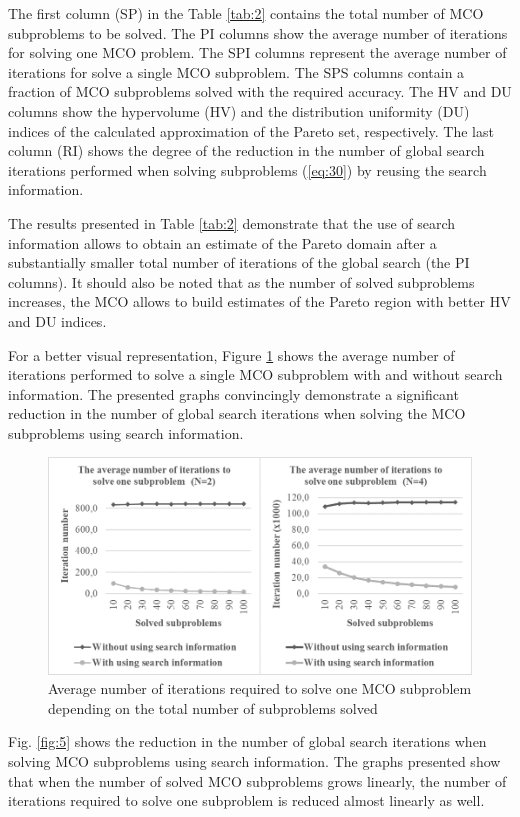 \documentclass[smallextended]{svjour3}       %
\begin{document}
The first column (SP) in the Table \ref{tab:2} contains the total number of MCO subproblems to be solved. The PI columns show the average number of iterations for solving one MCO problem. The SPI columns represent the average number of iterations for solve a single MCO subproblem. The SPS columns contain a fraction of MCO subproblems solved with the required accuracy. The HV and DU columns show the hypervolume (HV) and the distribution uniformity (DU) indices of the calculated approximation of the Pareto set, respectively. The last column (RI) shows the degree of the reduction in the number of global search iterations performed when solving subproblems (\ref{eq:30}) by reusing the search information.

The results presented in Table \ref{tab:2} demonstrate that the use of search information allows to obtain an estimate of the Pareto domain after a substantially smaller total number of iterations of the global search (the PI columns). It should also be noted that as the number of solved subproblems increases, the MCO allows to build estimates of the Pareto region with better HV and DU indices.

For a better visual representation, Figure \ref{fig:4} shows the average number of iterations performed to solve a single MCO subproblem with and without search information. The presented graphs convincingly demonstrate a significant reduction in the number of global search iterations when solving the MCO subproblems using search information.

\begin{figure}
  \centering
  \includegraphics[width=1\linewidth]{fig4}
  \caption{Average number of iterations required to solve one MCO subproblem depending on the total number of subproblems solved}
  \label{fig:4}
\end{figure}

Fig. \ref{fig:5} shows the reduction in the number of global search iterations when solving MCO subproblems using search information. The graphs presented show that when the number of solved MCO subproblems grows linearly, the number of iterations required to solve one subproblem is reduced almost linearly as well.
\end{document}
